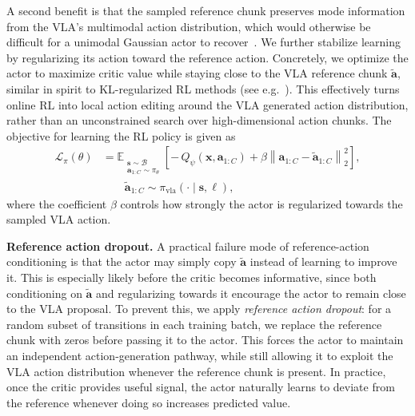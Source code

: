 A second benefit is that the sampled reference chunk preserves mode information from the VLA’s multimodal action distribution, which would otherwise be difficult for a unimodal Gaussian actor to recover~\cite{fql_park2025}.
We further stabilize learning by regularizing its action toward the reference action. Concretely, we optimize the actor to maximize critic value while staying close to the VLA reference chunk $\tilde{\mathbf{a}}$, similar in spirit to KL-regularized RL methods (see e.g.~\citep{peng2020learning,PetersREPS,Abdolmaleki2018MaximumAP,Dayan1997UsingEM,levine2018reinforcementlearningcontrolprobabilistic}). This effectively turns online RL into local action editing around the VLA generated action distribution, rather than an unconstrained search over high-dimensional action chunks. The objective for learning the RL policy is given as
\begin{equation}
\begin{aligned}
\mathcal{L}_{\pi}(\theta)
&=
\mathbb{E}_{\substack{\mathbf{s} \sim \mathcal{B} \\
\mathbf{a}_{1:C} \sim \pi_\theta}}
\left[
-\,Q_\psi(\mathbf{x}, \mathbf{a}_{1:C})
+\beta \left\|\mathbf{a}_{1:C}-\tilde{\mathbf{a}}_{1:C}\right\|_2^2
\right], \\
\qquad
& \qquad \tilde{\mathbf{a}}_{1:C}\sim\pi_{\mathrm{vla}}(\cdot\mid\mathbf{s}, \ell),
\end{aligned}
\label{eq:actor_loss}
\end{equation}
where the coefficient $\beta$ controls how strongly the actor is regularized towards the sampled VLA action. 

\textbf{Reference action dropout.} A practical failure mode of reference-action conditioning is that the actor may simply copy $\tilde{\mathbf{a}}$ instead of learning to improve it. This is especially likely before the critic becomes informative, since both conditioning on $\tilde{\mathbf{a}}$ and regularizing towards it encourage the actor to remain close to the VLA proposal. To prevent this, we apply \emph{reference action dropout}: for a random subset of transitions in each training batch, we replace the reference chunk with zeros before passing it to the actor. This forces the actor to maintain an independent action-generation pathway, while still allowing it to exploit the VLA action distribution whenever the reference chunk is present. In practice, once the critic provides useful signal, the actor naturally learns to deviate from the reference whenever doing so increases predicted value.





